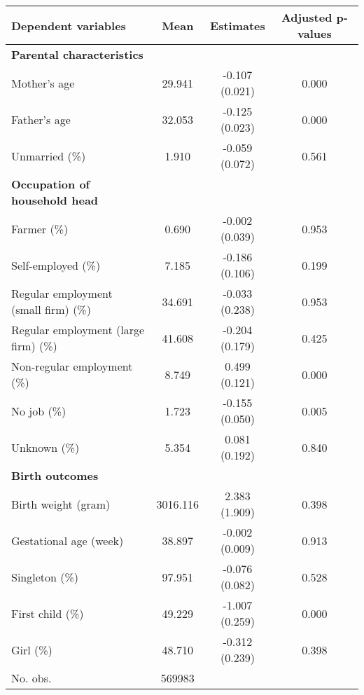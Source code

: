 \begin{tabular}{lccc}
\hline \hline 
Dependent variables & Mean & Estimates & Adjusted p-values \\
\hline 
\textbf{Parental characteristics} &  &  &  \\
Mother's age & 29.941 & \makecell[tc]{-0.107\\(0.021)} & 0.000 \\
Father's age & 32.053 & \makecell[tc]{-0.125\\(0.023)} & 0.000 \\
Unmarried (\%) & 1.910 & \makecell[tc]{-0.059\\(0.072)} & 0.561 \\
\hline 
\textbf{Occupation of household head} &  &  &  \\
Farmer (\%) & 0.690 & \makecell[tc]{-0.002\\(0.039)} & 0.953 \\
Self-employed (\%) & 7.185 & \makecell[tc]{-0.186\\(0.106)} & 0.199 \\
Regular employment (small firm) (\%) & 34.691 & \makecell[tc]{-0.033\\(0.238)} & 0.953 \\
Regular employment (large firm) (\%) & 41.608 & \makecell[tc]{-0.204\\(0.179)} & 0.425 \\
Non-regular employment (\%) & 8.749 & \makecell[tc]{0.499\\(0.121)} & 0.000 \\
No job (\%) & 1.723 & \makecell[tc]{-0.155\\(0.050)} & 0.005 \\
Unknown (\%) & 5.354 & \makecell[tc]{0.081\\(0.192)} & 0.840 \\
\hline 
\textbf{Birth outcomes} &  &  &  \\
Birth weight (gram) & 3016.116 & \makecell[tc]{2.383\\(1.909)} & 0.398 \\
Gestational age (week) & 38.897 & \makecell[tc]{-0.002\\(0.009)} & 0.913 \\
Singleton (\%) & 97.951 & \makecell[tc]{-0.076\\(0.082)} & 0.528 \\
First child (\%) & 49.229 & \makecell[tc]{-1.007\\(0.259)} & 0.000 \\
Girl (\%) & 48.710 & \makecell[tc]{-0.312\\(0.239)} & 0.398 \\
\hline 
No. obs. & 569983 &  &  \\
\hline \hline
\end{tabular}